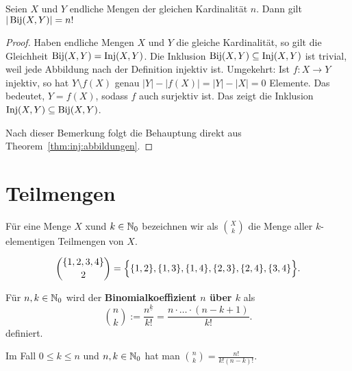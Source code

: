 \begin{kor}
	 Seien $X$ und $Y$ endliche Mengen der gleichen Kardinalität $n$. Dann gilt $|\operatorname{Bij}(X,Y)| = n!$
\end{kor} 
\begin{proof}
	Haben endliche Mengen $X$ und $Y$ die gleiche Kardinalität, so gilt die Gleichheit $\operatorname{Bij}(X,Y ) = \operatorname{Inj}(X,Y)$. Die Inklusion $\operatorname{Bij}(X,Y ) \subseteq \operatorname{Inj}(X,Y)$ ist trivial, weil jede Abbildung nach der Definition injektiv ist. Umgekehrt: Ist $f: X \to Y$ injektiv, so hat $Y \setminus f(X)$ genau $|Y| - |f(X)| = |Y| - |X| =0$ Elemente. Das bedeutet, $Y = f(X)$, sodass $f$ auch surjektiv ist. Das zeigt die Inklusion $\operatorname{Inj}(X,Y) \subseteq \operatorname{Bij}(X,Y)$. 
	
	Nach dieser Bemerkung folgt die Behauptung direkt aus Theorem~\ref{thm:inj:abbildungen}. 
\end{proof} 

\section{Teilmengen} 

\begin{defn}
Für eine Menge $X$ xund $k \in \mathbb{N}_0$ bezeichnen wir als $\binom{X}{k}$ die Menge aller $k$-elementigen Teilmengen von $X$. 
\end{defn}

\begin{bsp}
	\[
	\binom{\{1,2,3,4\}}{2} = \Bigl\{ \{1,2\},\{1,3\}, \{1,4\}, \{2,3\}, \{2,4\} ,\{3,4\} \Bigr\}.
	\]
\end{bsp} 


\begin{defn}
	Für $n,k \in \mathbb{N}_0$ wird der \textbf{Binomialkoeffizient  $n$ über $k$} als 
	\[
		\binom{n}{k}:= \frac{n^{\underline{k}}}{k!}  = \frac{n \cdot \ldots \cdot (n-k+1)}{k!}.
	\]
	definiert. 
\end{defn} 

\begin{bem}
	Im Fall $0 \le k \le n$ und $n,k \in \mathbb{N}_0$ hat man $\binom{n}{k} = \frac{n!}{k! (n-k)!}$. 
\end{bem} 


